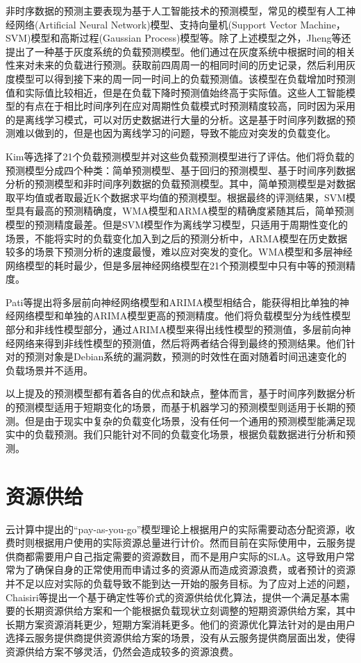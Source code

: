 非时序数据的预测主要表现为基于人工智能技术的预测模型，常见的模型有人工神经网络(Artificial Neural Network)模型、支持向量机(Support Vector Machine，SVM)模型和高斯过程(Gaussian Process)模型等。除了上述模型之外，Jheng等还提出了一种基于灰度系统的负载预测模型\cite{jheng2014novel}。他们通过在灰度系统中根据时间的相关性来对未来的负载进行预测。获取前四周周一的相同时间的历史记录，然后利用灰度模型可以得到接下来的周一同一时间上的负载预测值。该模型在负载增加时预测值和实际值比较相近，但是在负载下降时预测值始终高于实际值。这些人工智能模型的有点在于相比时间序列在应对周期性负载模式时预测精度较高，同时因为采用的是离线学习模式，可以对历史数据进行大量的分析。这是基于时间序列数据的预测难以做到的，但是也因为离线学习的问题，导致不能应对突发的负载变化。

Kim等选择了21个负载预测模型并对这些负载预测模型进行了评估\cite{kim2016empirical}。他们将负载的预测模型分成四个种类：简单预测模型、基于回归的预测模型、基于时间序列数据分析的预测模型和非时间序列数据的负载预测模型。其中，简单预测模型是对数据取平均值或者取最近K个数据求平均值的预测模型。根据最终的评测结果，SVM模型具有最高的预测精确度，WMA模型和ARMA模型的精确度紧随其后，简单预测模型的预测精度最差。但是SVM模型作为离线学习模型，只适用于周期性变化的场景，不能将实时的负载变化加入到之后的预测分析中，ARMA模型在历史数据较多的场景下预测分析的速度最慢，难以应对突发的变化。WMA模型和多层神经网络模型的耗时最少，但是多层神经网络模型在21个预测模型中只有中等的预测精度。

Pati等提出将多层前向神经网络模型和ARIMA模型相结合，能获得相比单独的神经网络模型和单独的ARIMA模型更高的预测精度\cite{pati2014comparison}。他们将负载模型分为线性模型部分和非线性模型部分，通过ARIMA模型来得出线性模型的预测值，多层前向神经网络来得到非线性模型的预测值，然后将两者结合得到最终的预测结果。他们针对的预测对象是Debian系统的漏洞数，预测的时效性在面对随着时间迅速变化的负载场景并不适用。

以上提及的预测模型都有着各自的优点和缺点，整体而言，基于时间序列数据分析的预测模型适用于短期变化的场景，而基于机器学习的预测模型则适用于长期的预测。但是由于现实中复杂的负载变化场景，没有任何一个通用的预测模型能满足现实中的负载预测。我们只能针对不同的负载变化场景，根据负载数据进行分析和预测。

\section{资源供给}
云计算中提出的“pay-as-you-go”模型理论上根据用户的实际需要动态分配资源，收费时则根据用户使用的实际资源总量进行计价\cite{armbrust2010view}。然而目前在实际使用中，云服务提供商都需要用户自己指定需要的资源数目，而不是用户实际的SLA\cite{patel2009service}。这导致用户常常为了确保自身的正常使用而申请过多的资源从而造成资源浪费，或者预计的资源并不足以应对实际的负载导致不能到达一开始的服务目标。为了应对上述的问题，Chaisiri等提出一个基于确定性等价式的资源供给优化算法，提供一个满足基本需要的长期资源供给方案和一个能根据负载现状立刻调整的短期资源供给方案，其中长期方案资源消耗更少，短期方案消耗更多\cite{chaisiri2012optimization}。他们的资源优化算法针对的是由用户选择云服务提供商提供资源供给方案的场景，没有从云服务提供商层面出发，使得资源供给方案不够灵活，仍然会造成较多的资源浪费。

